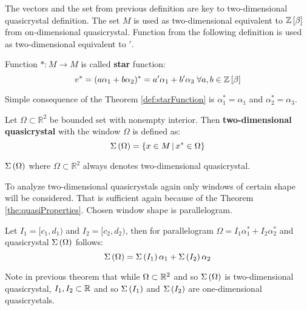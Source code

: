 \documentclass[text.tex]{subfiles}
\begin{document}
\begin{remark}
The vectors and the set from previous definition are key to two-dimensional quasicrystal definition. The set $M$ is used as two-dimensional equivalent to $\mathbb{Z}\left[\beta\right]$ from on-dimensional quasicrystal. Function from the following definition is used as two-dimensional equivalent to $'$.
\end{remark}

\begin{definition}
\label{def:starFunction}
Function $\ast: M \to M$ is called \textbf{star} function:
$$v^\ast = (a\alpha_1 + b\alpha_2)^\ast = a'\alpha_1 + b'\alpha_3 \;\forall a,b\in\mathbb{Z}\left[\beta\right]$$
\end{definition}

\begin{remark}
Simple consequence of the Theorem \ref{def:starFunction} is $\alpha_1^\ast = \alpha_1$ and $\alpha_2^\ast = \alpha_3$.
\end{remark}

\begin{definition}
Let $\Omega \subset \mathbb{R}^2$ be bounded set with nonempty interior. Then \textbf{two-dimensional quasicrystal} with the window $\Omega$ is defined as:
$$\Sigma\left(\Omega\right) = \left\{ x \in M\,|\,x^\ast \in \Omega \right\}$$
\end{definition}

\begin{remark}
$\Sigma\left(\Omega\right)$ where $\Omega \subset \mathbb{R}^2$ always denotes two-dimensional quasicrystal.
\end{remark}

To analyze two-dimensional quasicrystals again only windows of certain shape will be considered. That is sufficient again because of the Theorem \ref{the:quasiProperties}. Chosen window shape is parallelogram. 

\begin{theorem}
\label{the:twoToOne}
Let $I_1 = [c_1,d_1)$ and $I_2 = [c_2,d_2)$, then for parallelogram $\Omega = I_1\alpha_1^\ast + I_2\alpha_2^\ast$ and quasicrystal $\Sigma\left(\Omega\right)$ follows: 
$$\Sigma\left(\Omega\right) = \Sigma\left(I_1\right)\alpha_1 + \Sigma\left(I_2\right)\alpha_2$$
\end{theorem}

\begin{remark}
Note in previous theorem that while $\Omega \subset \mathbb{R}^2$ and so $\Sigma\left(\Omega\right)$ is two-dimensional quasicrystal, $I_1, I_2 \subset \mathbb{R}$ and so $\Sigma\left(I_1\right)$ and $\Sigma\left(I_2\right)$ are one-dimensional quasicrystals.
\end{remark}
\end{document}
